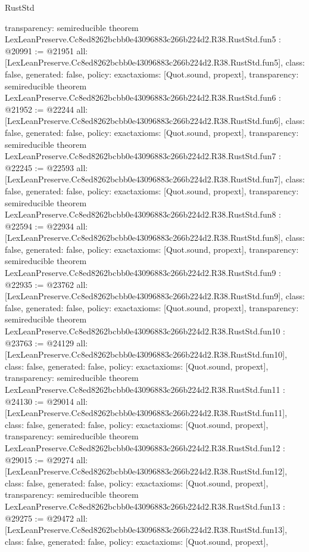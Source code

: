 \begin{lexlean}{RustStd}
\begin{coremodule}
{  transparency: semireducible
}
theorem LexLeanPreserve.Cc8ed8262bcbb0e43096883c266b224d2.R38.RustStd.fun5 : @20991 := @21951 {
  all: [LexLeanPreserve.Cc8ed8262bcbb0e43096883c266b224d2.R38.RustStd.fun5],
  class: false,
  generated: false,
  policy: exact{axioms: [Quot.sound, propext]},
  transparency: semireducible
}
theorem LexLeanPreserve.Cc8ed8262bcbb0e43096883c266b224d2.R38.RustStd.fun6 : @21952 := @22244 {
  all: [LexLeanPreserve.Cc8ed8262bcbb0e43096883c266b224d2.R38.RustStd.fun6],
  class: false,
  generated: false,
  policy: exact{axioms: [Quot.sound, propext]},
  transparency: semireducible
}
theorem LexLeanPreserve.Cc8ed8262bcbb0e43096883c266b224d2.R38.RustStd.fun7 : @22245 := @22593 {
  all: [LexLeanPreserve.Cc8ed8262bcbb0e43096883c266b224d2.R38.RustStd.fun7],
  class: false,
  generated: false,
  policy: exact{axioms: [Quot.sound, propext]},
  transparency: semireducible
}
theorem LexLeanPreserve.Cc8ed8262bcbb0e43096883c266b224d2.R38.RustStd.fun8 : @22594 := @22934 {
  all: [LexLeanPreserve.Cc8ed8262bcbb0e43096883c266b224d2.R38.RustStd.fun8],
  class: false,
  generated: false,
  policy: exact{axioms: [Quot.sound, propext]},
  transparency: semireducible
}
theorem LexLeanPreserve.Cc8ed8262bcbb0e43096883c266b224d2.R38.RustStd.fun9 : @22935 := @23762 {
  all: [LexLeanPreserve.Cc8ed8262bcbb0e43096883c266b224d2.R38.RustStd.fun9],
  class: false,
  generated: false,
  policy: exact{axioms: [Quot.sound, propext]},
  transparency: semireducible
}
theorem LexLeanPreserve.Cc8ed8262bcbb0e43096883c266b224d2.R38.RustStd.fun10 : @23763 := @24129 {
  all: [LexLeanPreserve.Cc8ed8262bcbb0e43096883c266b224d2.R38.RustStd.fun10],
  class: false,
  generated: false,
  policy: exact{axioms: [Quot.sound, propext]},
  transparency: semireducible
}
theorem LexLeanPreserve.Cc8ed8262bcbb0e43096883c266b224d2.R38.RustStd.fun11 : @24130 := @29014 {
  all: [LexLeanPreserve.Cc8ed8262bcbb0e43096883c266b224d2.R38.RustStd.fun11],
  class: false,
  generated: false,
  policy: exact{axioms: [Quot.sound, propext]},
  transparency: semireducible
}
theorem LexLeanPreserve.Cc8ed8262bcbb0e43096883c266b224d2.R38.RustStd.fun12 : @29015 := @29274 {
  all: [LexLeanPreserve.Cc8ed8262bcbb0e43096883c266b224d2.R38.RustStd.fun12],
  class: false,
  generated: false,
  policy: exact{axioms: [Quot.sound, propext]},
  transparency: semireducible
}
theorem LexLeanPreserve.Cc8ed8262bcbb0e43096883c266b224d2.R38.RustStd.fun13 : @29275 := @29472 {
  all: [LexLeanPreserve.Cc8ed8262bcbb0e43096883c266b224d2.R38.RustStd.fun13],
  class: false,
  generated: false,
  policy: exact{axioms: [Quot.sound, propext]},
}
\end{coremodule}
\end{lexlean}
